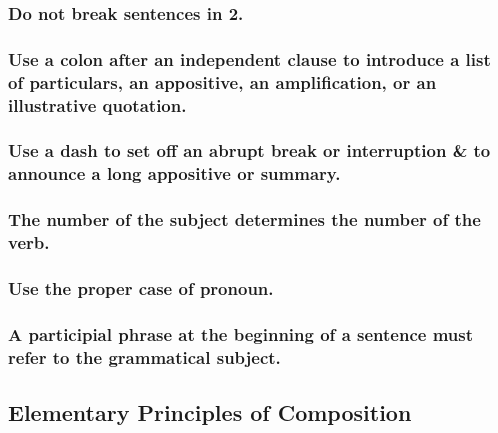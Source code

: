 \documentclass{article}
\begin{document}
\subsubsection{Do not break sentences in 2.}


\subsubsection{Use a colon after an independent clause to introduce a list of particulars, an appositive, an amplification, or an illustrative quotation.}


\subsubsection{Use a dash to set off an abrupt break or interruption \& to announce a long appositive or summary.}


\subsubsection{The number of the subject determines the number of the verb.}


\subsubsection{Use the proper case of pronoun.}


\subsubsection{A participial phrase at the beginning of a sentence must refer to the grammatical subject.}


\subsection{Elementary Principles of Composition}
\end{document}
